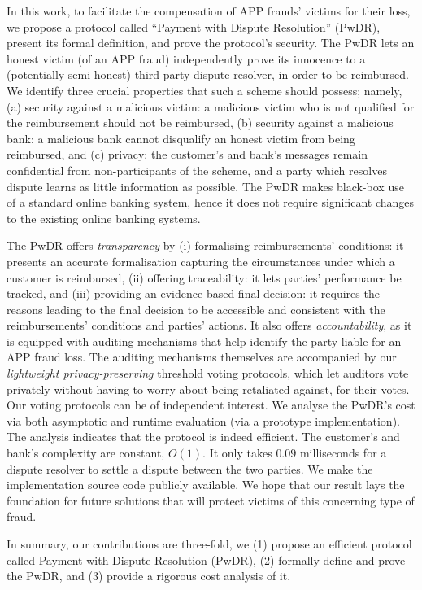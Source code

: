  In this work, to facilitate the compensation of   APP frauds' victims for their loss, we propose a protocol called ``Payment with Dispute Resolution'' (PwDR), present its formal definition,  and prove the protocol's security.  The PwDR lets an honest victim (of an APP fraud)  independently prove its innocence to a  (potentially semi-honest) third-party dispute resolver, in order to be reimbursed.  We identify three crucial properties that such a scheme should possess; namely, (a) security against a malicious victim: a malicious victim who is not qualified for the reimbursement should not be reimbursed, (b) security against a malicious bank: a malicious bank cannot disqualify an honest victim from being reimbursed, and (c) privacy: the customer’s and bank’s messages remain confidential from non-participants of the scheme, and a party which resolves dispute learns as little information as possible.  The PwDR makes black-box use of a standard online banking system, hence it does not require significant changes to the existing online banking systems.%


  The PwDR offers \emph{transparency} by (i) formalising reimbursements' conditions: it presents an accurate formalisation capturing the circumstances under which a customer is reimbursed,  (ii) offering traceability:  it lets parties'  performance be tracked, and (iii) providing an evidence-based final decision: it requires the reasons leading to the final decision to be accessible and consistent with the reimbursements' conditions and parties' actions.  It also offers \emph{accountability}, as it is equipped with auditing mechanisms that help identify the party liable for an APP fraud loss.  The auditing mechanisms themselves are accompanied by our \emph{lightweight privacy-preserving} threshold voting protocols, which let auditors vote privately without having to worry about being retaliated against,  for their votes. Our voting protocols can be of independent interest.   We analyse the PwDR's cost via both asymptotic and runtime evaluation (via a prototype implementation). The analysis indicates that the protocol is indeed efficient. The customer's and bank's complexity are constant, $O(1)$. It only takes $0.09$ milliseconds for a dispute resolver to settle a dispute between the two parties. We make the implementation source code publicly available. We hope that our result lays the foundation for future solutions that will protect victims of this concerning type of fraud. 

In summary,  our contributions are three-fold, we (1) propose an efficient protocol called Payment with Dispute Resolution (PwDR), (2) formally define and prove the PwDR, and (3)  provide a rigorous cost analysis of it.     






